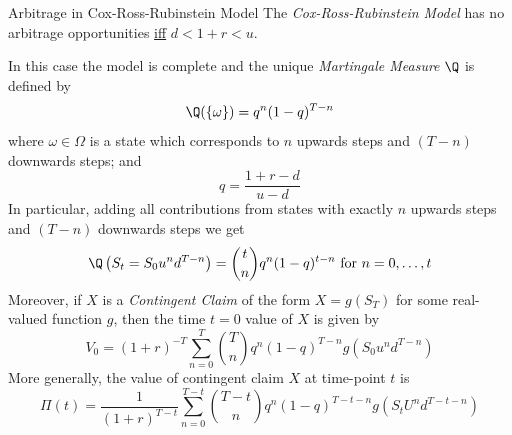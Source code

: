 \documentclass[11pt,a4paper]{article}
\begin{document}
  \begin{theorem}{Arbitrage in Cox-Ross-Rubinstein Model}\label{the_arbitrage_in_cox_ross_rubinstein_model}
    The \textit{Cox-Ross-Rubinstein Model} has no arbitrage opportunities \underline{iff} $d<1+r<u$.
    \par In this case the model is complete and the unique \textit{Martingale Measure} $\Q$ is defined by
    \[ \Q(\{\omega\})=q^n(1-q)^{T-n} \]
    where $\omega\in\Omega$ is a state which corresponds to $n$ upwards steps and $(T-n)$ downwards steps; and
    \[ q=\frac{1+r-d}{u-d} \]
    In particular, adding all contributions from states with exactly $n$ upwards steps and $(T-n)$ downwards steps we get
    \[ \Q\left(S_t=S_0u^nd^{T-n}\right)={t \choose n}q^n(1-q)^{t-n}\text{ for }n=0,\dots,t \]
    Moreover, if $X$ is a \textit{Contingent Claim} of the form $X=g(S_T)$ for some real-valued function $g$, then the time $t=0$ value of $X$ is given by
    \[ V_0=(1+r)^{-T}\sum_{n=0}^T{T\choose n}q^n(1-q)^{T-n}g(S_0u^nd^{T-n}) \]
    More generally, the value of contingent claim $X$ at time-point $t$ is
    \[ \Pi(t)=\frac1{(1+r)^{T-t}}\sum_{n=0}^{T-t}{T-t\choose n}q^n(1-q)^{T-t-n}g(S_tU^nd^{T-t-n}) \]
  \end{theorem}
\end{document}
